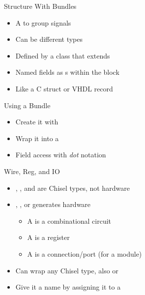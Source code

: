\begin{frame}[fragile]{Structure With Bundles}
\begin{itemize}
\item A  to group signals
\item Can be different types
\item Defined by a class that extends 
\item Named fields as s within the block
\item Like a C struct or VHDL record
\end{itemize}
\end{frame}

\begin{frame}[fragile]{Using a Bundle}
\begin{itemize}
\item Create it with 
\item Wrap it into a 
\item Field access with \emph{dot} notation
\end{itemize}
\end{frame}

\begin{frame}[fragile]{Wire, Reg, and IO}
\begin{itemize}
\item {}, , and  are Chisel types, not hardware
\item {}, , or  generates hardware
\begin{itemize}
\item A  is a combinational circuit
\item A  is a register
\item A  is a connection/port (for a module)
\end{itemize}
\item Can wrap any Chisel type, also  or 
\item Give it a name by assigning it to a 
\end{itemize}
\end{frame}

